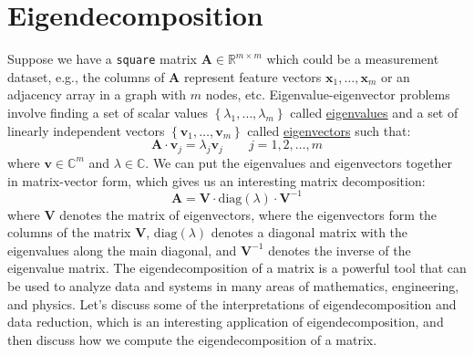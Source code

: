 \documentclass{article}[11pt]
\begin{document}

\section{Eigendecomposition}
Suppose we have a \texttt{square} matrix $\mathbf{A}\in\mathbb{R}^{m\times{m}}$ which could be a measurement dataset, e.g., the columns of $\mathbf{A}$ represent feature 
vectors $\mathbf{x}_{1},\dots,\mathbf{x}_{m}$ or an adjacency array in a graph with $m$ nodes, etc. Eigenvalue-eigenvector problems involve finding a set of scalar values $\left\{\lambda_{1},\dots,\lambda_{m}\right\}$ called 
\href{https://mathworld.wolfram.com/Eigenvalue.html}{eigenvalues} and a set of linearly independent vectors 
$\left\{\mathbf{v}_{1},\dots,\mathbf{v}_{m}\right\}$ called \href{https://mathworld.wolfram.com/Eigenvector.html}{eigenvectors} such that:
\begin{equation}
\mathbf{A}\cdot\mathbf{v}_{j} = \lambda_{j}\mathbf{v}_{j}\qquad{j=1,2,\dots,m}
\end{equation}
where $\mathbf{v}\in\mathbb{C}^{m}$ and $\lambda\in\mathbb{C}$. We can put the eigenvalues and eigenvectors together in matrix-vector form, which gives us an interesting matrix decomposition:
\begin{equation}
\mathbf{A} = \mathbf{V}\cdot\text{diag}(\lambda)\cdot\mathbf{V}^{-1}
\end{equation}
where $\mathbf{V}$ denotes the matrix of eigenvectors, where the eigenvectors form the columns of the matrix $\mathbf{V}$, $\text{diag}(\lambda)$ denotes a diagonal matrix with the eigenvalues along the main diagonal, 
and $\mathbf{V}^{-1}$ denotes the inverse of the eigenvalue matrix.
The eigendecomposition of a matrix is a powerful tool that can be used to analyze data and systems in many areas of mathematics, engineering, and physics.
Let's discuss some of the interpretations of eigendecomposition and data reduction, which is an interesting application of eigendecomposition, and then discuss how we compute the eigendecomposition of a matrix.
\end{document}
